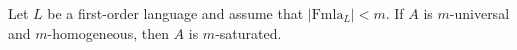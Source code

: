 Let $L$ be a first-order language and assume that $|\text{Fmla}_L| < m$. If $A$ is $m$-universal and $m$-homogeneous, then $A$ is $m$-saturated.
